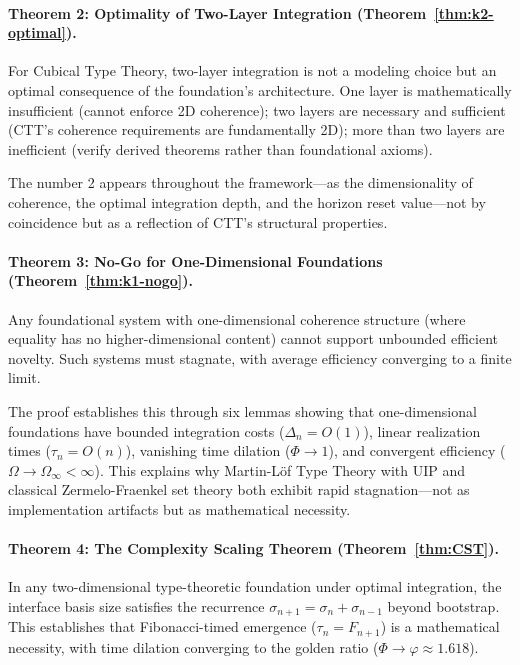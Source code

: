 \documentclass[11pt]{article}
\theoremstyle{definition}
\theoremstyle{remark}
\begin{document}
\paragraph{Theorem 2: Optimality of Two-Layer Integration (Theorem~\ref{thm:k2-optimal}).}
For Cubical Type Theory, two-layer integration is not a modeling choice but an optimal consequence
of the foundation's architecture. One layer is mathematically insufficient (cannot enforce 2D coherence);
two layers are necessary and sufficient (CTT's coherence requirements are fundamentally 2D); more
than two layers are inefficient (verify derived theorems rather than foundational axioms).

The number 2 appears throughout the framework---as the dimensionality of coherence, the optimal
integration depth, and the horizon reset value---not by coincidence but as a reflection of CTT's
structural properties.

\paragraph{Theorem 3: No-Go for One-Dimensional Foundations (Theorem~\ref{thm:k1-nogo}).}
Any foundational system with one-dimensional coherence structure (where equality has no higher-dimensional
content) cannot support unbounded efficient novelty. Such systems must stagnate, with
average efficiency converging to a finite limit.

The proof establishes this through six lemmas showing that one-dimensional foundations have
bounded integration costs ($\Delta_n = O(1)$), linear realization times ($\tau_n = O(n)$), vanishing time
dilation ($\Phi \to 1$), and convergent efficiency ($\Omega \to \Omega_\infty < \infty$). This explains why Martin-Löf
Type Theory with UIP and classical Zermelo-Fraenkel set theory both exhibit rapid stagnation---not
as implementation artifacts but as mathematical necessity.

\paragraph{Theorem 4: The Complexity Scaling Theorem (Theorem~\ref{thm:CST}).}
In any two-dimensional type-theoretic foundation under optimal integration, the interface basis size
satisfies the recurrence $\sigma_{n+1} = \sigma_n + \sigma_{n-1}$ beyond bootstrap. This establishes that
Fibonacci-timed emergence ($\tau_n = F_{n+1}$) is a mathematical necessity, with time dilation converging
to the golden ratio ($\Phi \to \varphi \approx 1.618$).
\end{document}
